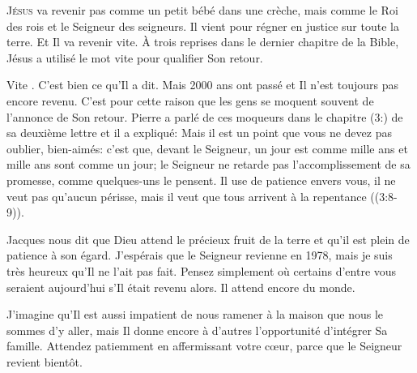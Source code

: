 \jrnlmonth




\lettrine{J}{ésus} va revenir \ocadr pas comme un petit bébé dans une crèche,
 mais comme le Roi des rois et le Seigneur des seigneurs.
 Il vient pour régner en justice sur toute la terre. Et Il va revenir vite.
 À trois reprises dans le dernier chapitre de la Bible, Jésus a utilisé le mot
 \Og vite \Fg{} pour qualifier Son retour.

\Og Vite \Fg{}. C'est bien ce qu'Il a dit.
 Mais 2000 ans ont passé et Il n'est toujours pas encore revenu.
 C'est pour cette raison que les gens se moquent souvent de l'annonce
 de Son retour. Pierre a parlé de ces moqueurs dans le chapitre
 (3:)
 de sa deuxième lettre et il a expliqué:
 \Og Mais il est un point que vous ne devez pas oublier, bien-aimés:
 c'est que, devant le Seigneur, un jour est comme mille ans et mille ans
 sont comme un jour; le Seigneur ne retarde pas l'accomplissement
 de sa promesse, comme quelques-uns le pensent.
 Il use de patience envers vous, il ne veut pas qu'aucun périsse,
 mais il veut que tous arrivent à la repentance \Fg{}
 ((3:8-9)).


Jacques nous dit que Dieu attend le précieux fruit de la terre
 et qu'il est plein de patience à son égard.
 J'espérais que le Seigneur revienne en 1978, mais je suis très heureux
 qu'Il ne l'ait pas fait. Pensez simplement où certains d'entre vous seraient
 aujourd'hui s'Il était revenu alors. Il attend encore du monde.

J'imagine qu'Il est aussi impatient de nous ramener à la maison
 que nous le sommes d'y aller, mais Il donne encore à d'autres l'opportunité
 d'intégrer Sa famille. Attendez patiemment en affermissant votre c\oe{}ur,
 parce que le Seigneur revient bientôt.

\dvrule





